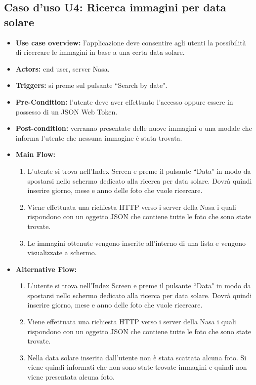 \subsection*{Caso d'uso U4: Ricerca immagini per data solare}
\begin{itemize}
    \item  \textbf{Use case overview:} l'applicazione deve consentire agli utenti la possibilit\`a di ricercare le immagini in base a una certa data solare.
    \item \textbf{Actors:} end user, server Nasa.
    \item \textbf{Triggers:} si preme sul pulsante ``Search by date".
    \item \textbf{Pre-Condition:} l'utente deve aver effettuato l'accesso oppure essere in possesso di un JSON Web Token.
    \item \textbf{Post-condition:} verranno presentate delle nuove immagini o una modale che informa l'utente che nessuna immagine \`e stata trovata.
    \item \textbf{Main Flow:} \begin{enumerate}
              \item L'utente si trova nell'Index Screen e preme il pulsante ``Data" in modo da spostarsi nello schermo dedicato alla ricerca per data solare. Dovr\`a quindi inserire giorno, mese e anno delle foto che vuole ricercare.
              \item Viene effettuata una richiesta HTTP verso i server della Nasa i quali rispondono con un oggetto JSON che contiene tutte le foto che sono state trovate.
              \item Le immagini ottenute vengono inserite all'interno di una lista e vengono visualizzate a schermo.

          \end{enumerate}
    \item \textbf{Alternative Flow:}\begin{enumerate}
              \item L'utente si trova nell'Index Screen e preme il pulsante ``Data" in modo da spostarsi nello schermo dedicato alla ricerca per data solare. Dovr\`a quindi inserire giorno, mese e anno delle foto che vuole ricercare.
              \item Viene effettuata una richiesta HTTP verso i server della Nasa i quali rispondono con un oggetto JSON che contiene tutte le foto che sono state trovate.
              \item Nella data solare inserita dall'utente non \`e stata scattata alcuna foto. Si viene quindi informati che non sono state trovate immagini e quindi non viene presentata alcuna foto.

          \end{enumerate}
\end{itemize}

